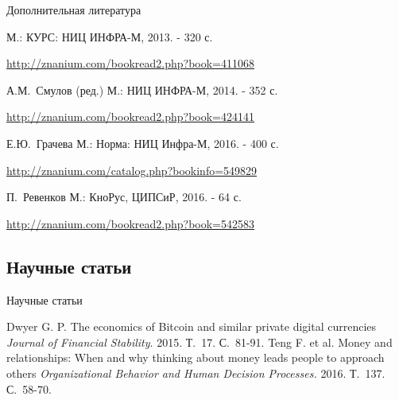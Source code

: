 \documentclass[_Banking_p1.tex]{subfiles}
\begin{document}
\begin{frame}[ allowframebreaks]{Дополнительная литература}
  \begin{thebibliography}{10}
    
  \beamertemplatebookbibitems


\newblock М.: КУРС: НИЦ ИНФРА-М, 2013. - 320 с.

\footnotesize{\url{http://znanium.com/bookread2.php?book=411068}}

А.М.~Смулов (ред.)
\newblock М.: НИЦ ИНФРА-М, 2014. - 352 с.

\footnotesize{\url{http://znanium.com/bookread2.php?book=424141}}

\pagebreak

Е.Ю.~Грачева
\newblock М.: Норма: НИЦ Инфра-М, 2016. - 400 с.

\footnotesize{\url{http://znanium.com/catalog.php?bookinfo=549829}} 

П.~Ревенков    
\newblock М.: КноРус, ЦИПСиР, 2016. - 64 с.

\footnotesize{\url{http://znanium.com/bookread2.php?book=542583}} 

  \end{thebibliography}
\end{frame}

\subsection*{Научные статьи}

\begin{frame}{Научные статьи}
  \begin{thebibliography}{10}
  \beamertemplatearticlebibitems
	\newblock Dwyer G. P. 
	\newblock The economics of Bitcoin and similar private digital 		currencies {\em Journal of Financial Stability}. 2015. Т.~17. С.~81-91.
	\newblock Teng F. et al. 
	\newblock Money and relationships: When and why thinking about money leads people to approach others {\em Organizational Behavior and Human Decision Processes.} 2016. Т.~137. С.~58-70.
  \end{thebibliography}
\end{frame}
\end{document}
